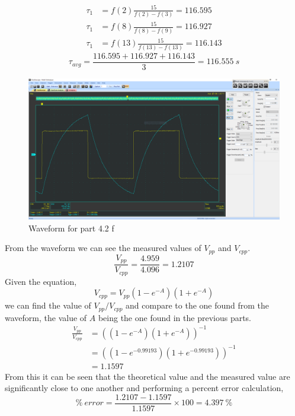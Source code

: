 \documentclass[12pt]{article}
\begin{document}
    \begin{align*}
        \tau_1 &= f(2) \frac{15}{f(2) - f(3)} = 116.595 \\
        \tau_1 &= f(8) \frac{15}{f(8) - f(9)} = 116.927 \\
        \tau_1 &= f(13) \frac{15}{f(13) - f(13)} = 116.143
    \end{align*}
    \[
        \tau_{avg} = \frac{116.595 + 116.927 + 116.143}{3} = \boxed{116.555\ s}
    \]
    \newpage
    \begin{figure}[h]
        \centering
        \includegraphics[width=\textwidth]{4.2 f.png}
        \caption{Waveform for part 4.2 f}
    \end{figure}
    \par From the waveform we can see the measured values of $ V_{pp} $ and $ V_{cpp} $.
    \[
        \frac{V_{pp}}{V_{cpp}} = \frac{4.959}{4.096} = 1.2107
    \]
    Given the equation,
    \[
        V_{cpp} = V_{pp} \left( 1-e^{-A} \right) \left( 1+e^{-A} \right)
    \]
    we can find the value of $ V_{pp} / V_{cpp} $ and compare to the one found from the waveform, the value of $ A $ being the one found in the previous parts.
    \begin{align*}
        \frac{V_{pp}}{V_{cpp}} &= \left( \left( 1-e^{-A} \right) \left( 1+e^{-A} \right) \right)^{-1} \\
                               &= \left( \left( 1-e^{-0.99193} \right) \left( 1+e^{-0.99193} \right) \right)^{-1} \\
                               &= 1.1597
    \end{align*}
    From this it can be seen that the theoretical value and the measured value are significantly close to one another and performing a percent error calculation,
    \[
        \%\ error = \frac{1.2107 - 1.1597}{1.1597} \times 100 = 4.397\ \%
    \]
\end{document}
